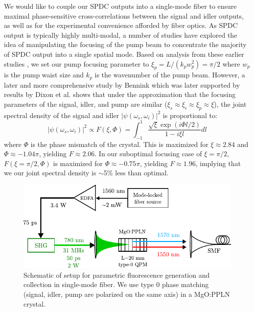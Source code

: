 We would like to couple our SPDC outputs into a single-mode fiber to ensure maximal phase-sensitive cross-correlations between the signal and idler outputs, as well as for the experimental convenience afforded by fiber optics. As SPDC output is typically highly multi-modal, a number of studies \cite{ljunggren-focus,kurtsiefer-spdc,bovino-focus,bennink-focus,fedrizzi-focus,boyd-focus} have explored the idea of manipulating the focusing of the pump beam to concentrate the majority of SPDC output into a single spatial mode. Based on analysis from these earlier studies \cite{legouet-interferometry}, we set our pump focusing parameter to $\xi_p = L/(k_p w_p^2) = \pi/2$ where $w_p$ is the pump waist size and $k_p$ is the wavenumber of the pump beam. However, a later and more comprehensive study by Bennink \cite{bennink-optimal} which was later supported by results by Dixon et al. \cite{dixon-heralding} shows that under the approximation that the focusing parameters of the signal, idler, and pump are similar ($\xi_s \approx \xi_i \approx \xi_p \approx \xi$), the joint spectral density of the signal and idler $|\psi(\omega_s, \omega_i)|^2$ is proportional to:
\begin{equation}
|\psi(\omega_s, \omega_i)|^2 \propto F(\xi,\Phi) = \int_{-1}^1 \frac{\sqrt{\xi} \exp(i\Phi l/2)}{1-i\xi l} dl
\end{equation}
where $\Phi$ is the phase mismatch of the crystal. This is maximized for $\xi \approx 2.84$ and $\Phi \approx -1.04\pi$, yielding $F \approx 2.06$. In our suboptimal focusing case of $\xi = \pi/2$, $F(\xi = \pi/2, \Phi)$ is maximized for $\Phi \approx -0.75\pi$, yielding $F \approx 1.96$, implying that we our joint spectral density is $\sim$5\% less than optimal.

\begin{figure}[t]
\begin{center}
\includegraphics[width=13cm]{figure-pcoct-setup-spdc.pdf}
\caption{Schematic of setup for parametric fluorescence generation and collection in single-mode fiber. We use type 0 phase matching (signal, idler, pump are polarized on the same axis) in a MgO:PPLN crystal.}
\label{figure:pcoct-setup-spdc}
\end{center}
\end{figure}

